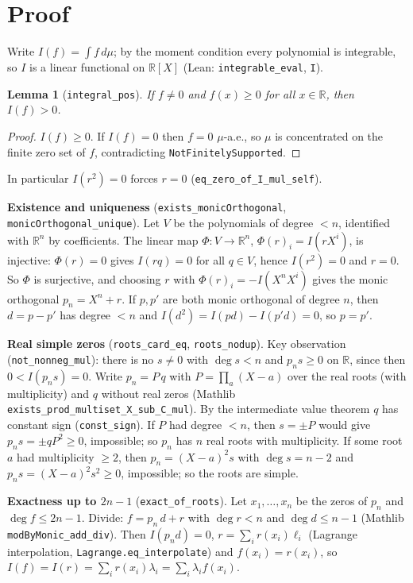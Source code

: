 \documentclass[11pt]{article}
\newtheorem{lemma}[theorem]{Lemma}
\theoremstyle{definition}
\newcommand{\R}{\mathbb{R}}
\begin{document}
\section{Proof}

Write $I(f)=\int f\,d\mu$; by the moment condition every polynomial is integrable, so $I$ is a
linear functional on $\R[X]$ (Lean: \texttt{integrable\_eval}, \texttt{I}).

\begin{lemma}[\texttt{integral\_pos}]
If $f\neq 0$ and $f(x)\ge 0$ for all $x\in\R$, then $I(f)>0$.
\end{lemma}
\begin{proof}
$I(f)\ge 0$. If $I(f)=0$ then $f=0$ $\mu$-a.e., so $\mu$ is concentrated on the finite zero set of
$f$, contradicting \texttt{NotFinitelySupported}.
\end{proof}
In particular $I(r^2)=0$ forces $r=0$ (\texttt{eq\_zero\_of\_I\_mul\_self}).

\textbf{Existence and uniqueness} (\texttt{exists\_monicOrthogonal},
\texttt{monicOrthogonal\_unique}). Let $V$ be the polynomials of degree $<n$, identified with $\R^n$
by coefficients. The linear map $\Phi:V\to\R^n$, $\Phi(r)_i=I(rX^i)$, is injective: $\Phi(r)=0$
gives $I(rq)=0$ for all $q\in V$, hence $I(r^2)=0$ and $r=0$. So $\Phi$ is surjective, and choosing
$r$ with $\Phi(r)_i=-I(X^{n}X^i)$ gives the monic orthogonal $p_n=X^n+r$. If $p,p'$ are both monic
orthogonal of degree $n$, then $d=p-p'$ has degree $<n$ and $I(d^2)=I(pd)-I(p'd)=0$, so $p=p'$.

\textbf{Real simple zeros} (\texttt{roots\_card\_eq}, \texttt{roots\_nodup}). Key observation
(\texttt{not\_nonneg\_mul}): there is no $s\neq 0$ with $\deg s<n$ and $p_n s\ge 0$ on $\R$, since
then $0<I(p_ns)=0$. Write $p_n=P\,q$ with $P=\prod_{a}(X-a)$ over the real roots (with
multiplicity) and $q$ without real zeros (Mathlib \texttt{exists\_prod\_multiset\_X\_sub\_C\_mul}).
By the intermediate value theorem $q$ has constant sign (\texttt{const\_sign}). If $P$ had degree
$<n$, then $s=\pm P$ would give $p_ns=\pm q P^2\ge 0$, impossible; so $p_n$ has $n$ real roots with
multiplicity. If some root $a$ had multiplicity $\ge 2$, then $p_n=(X-a)^2s$ with $\deg s=n-2$ and
$p_ns=(X-a)^2s^2\ge 0$, impossible; so the roots are simple.

\textbf{Exactness up to $2n-1$} (\texttt{exact\_of\_roots}). Let $x_1,\dots,x_n$ be the zeros of
$p_n$ and $\deg f\le 2n-1$. Divide: $f=p_n\,d+r$ with $\deg r<n$ and $\deg d\le n-1$ (Mathlib
\texttt{modByMonic\_add\_div}). Then $I(p_nd)=0$, $r=\sum_i r(x_i)\ell_i$ (Lagrange interpolation,
\texttt{Lagrange.eq\_interpolate}) and $f(x_i)=r(x_i)$, so
$I(f)=I(r)=\sum_i r(x_i)\lambda_i=\sum_i\lambda_i f(x_i)$.
\end{document}
